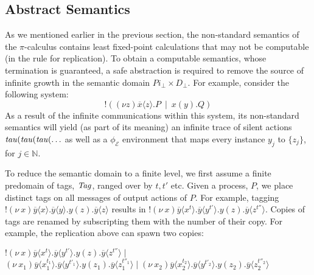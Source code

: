\documentclass[10pt,a4paper,final,oneside,fleqn]{book}
\begin{document}
\subsection{Abstract Semantics\label{sect:abssempi}}
As we mentioned earlier in the previous section, the non-standard semantics of the $\pi$-calculus contains least fixed-point calculations that may not be computable (in the rule for replication).  To obtain a computable semantics, whose termination is guaranteed, a safe abstraction is required to remove the source of infinite growth in the semantic domain $Pi_\bot\times D_\bot$.  For example, consider the following system:
\[!((\nu z)\overline{x}\langle z\rangle.P~\mid~x(y).Q)\]
As a result of the infinite communications within this system, its non-standard semantics will yield (as part of its meaning) an infinite trace of silent actions $\mbox{{\itshape tau\/}}(\mbox{{\itshape tau\/}}(\mbox{{\itshape tau\/}}(\ldots$ as well as a $\phi_\mathcal{E}$ environment that maps every instance $y_j$ to $\{z_j\}$, for $j\in\mathbb{N}$.

To reduce the semantic domain to a finite level, we first assume a finite predomain of tags, $\mbox{{\itshape Tag\/}}$, ranged over by $t, t'$ etc.  Given a process, $P$, we place distinct tags on all messages of output actions of $P$.  For example, tagging $!(\nu~\!x)\overline{y}\langle x\rangle.\overline{y}\langle y\rangle.y(z).\overline{y}\langle z\rangle$ results in $!(\nu~\!x)\overline{y}\langle x^t\rangle.\overline{y}\langle y^{t'}\rangle.y(z).\overline{y}\langle z^{t''}\rangle$.  Copies of tags are renamed by subscripting them with the number of their copy. For example, the replication above can spawn two copies:

\noindent
$!(\nu~\!x)\overline{y}\langle x^t\rangle.\overline{y}\langle y^{t'}\rangle.y(z).\overline{y}\langle z^{t''}\rangle\mid$\\
$(\nu~\!x_1)\overline{y}\langle x_1^{t_1}\rangle.\overline{y}\langle y^{t'_1}\rangle.y(z_1).\overline{y}\langle z^{t''_1}_1\rangle\mid(\nu~\!x_2)\overline{y}\langle x_2^{t_2}\rangle.\overline{y}\langle y^{t'_2}\rangle.y(z_2).\overline{y}\langle z^{t''_2}_2\rangle$\vspace{3mm}
\end{document}
